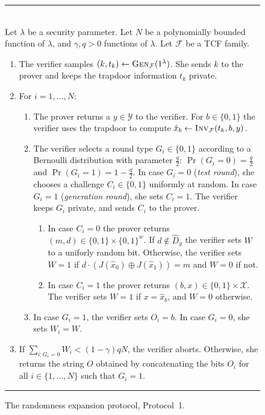 \documentclass[11pt]{article}
\theoremstyle{remark}
\theoremstyle{definition}
\newcommand{\mF}{\ensuremath{\mathcal{F}}}
\newcommand{\mX}{\ensuremath{\mathcal{X}}}
\newcommand{\mY}{\ensuremath{\mathcal{Y}}}
\newcommand{\Inv}{\ensuremath{\textsc{Inv}}}
\newcommand{\Gen}{\textsc{Gen}}
\newcommand{\inj}{J}
\begin{document}
\begin{figure}[htbp]
\rule[1ex]{16.5cm}{0.5pt}\\
Let $\lambda$ be a security parameter. Let $N$ be a polynomially bounded function of $\lambda$, and $\gamma,q>0$ functions of $\lambda$. Let $\mF$ be a TCF family.
\begin{enumerate}
\item The verifier samples $(k,t_k)\leftarrow \Gen_\mF(1^\lambda)$. She sends $k$ to the prover and keeps the trapdoor information $t_k$ private. 
\item For $i=1,\ldots,N$:
\begin{enumerate}
\item The prover returns a  $y \in \mY$ to the verifier. For $b\in\{0,1\}$ the verifier uses the trapdoor to compute $\hat{x}_b\leftarrow \Inv_\mF(t_k,b,y)$. 
\item The verifier selects a round type $G_i \in \{0,1\}$ according to a Bernoulli  distribution with parameter $\frac{q}{2}$: $\Pr(G_i=0)=\frac{q}{2}$ and $\Pr(G_i=1)=1-\frac{q}{2}$. In case $G_i=0$ (\emph{test round}), she chooses a challenge $C_i\in \{0,1\}$ uniformly at random. In case $G_i=1$ (\emph{generation round}), she sets $C_i=1$. The verifier keeps $G_i$ private, and sends $C_i$ to the prover. 
\begin{enumerate}
\item In case $C_i=0$ the prover returns $(m,d)\in\{0,1\}\times \{0,1\}^w$. If $d\notin \hat{D}_y$ the verifier sets $W$ to a uniforly random bit. Otherwise, the verifier sets $W=1$ if $d\cdot (\inj(\hat{x}_0)\oplus \inj(\hat{x}_1)) = m$ and $W=0$ if not.
\item In case $C_i=1$ the prover returns $(b,x)\in\{0,1\}\times \mX$. The verifier sets $W=1$ if $x = \hat{x}_b$, and $W=0$ otherwise. 
\end{enumerate}
\item In case $G_i=1$, the verifier sets $O_i = b$. In case $G_i=0$, she sets $W_i = W$. 
\end{enumerate}
\item If $\sum_{i: G_i=0} W_i < (1-\gamma)qN$, the verifier aborts. Otherwise, she returns the string $O$ obtained by concatenating the bits $O_i$ for all $i\in\{1,\ldots,N\}$ such that $G_i=1$. 
\end{enumerate}
\rule[1ex]{16.5cm}{0.5pt}
\caption{The randomness expansion protocol, Protocol~1.}
\label{fig:protocol}
\end{figure}
\end{document}
